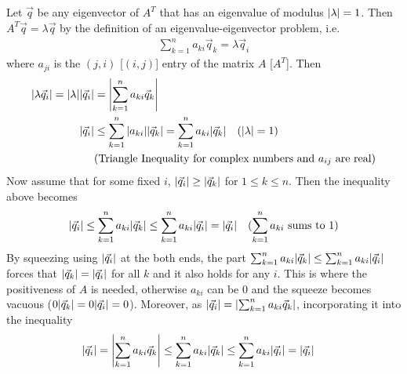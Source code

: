 Let $\vec{q}$ be any eigenvector of $A^T$ that has an eigenvalue of modulus $\abs{\lambda} = 1$. Then $A^T\vec{q} = \lambda \vec{q}$ by the definition of an eigenvalue-eigenvector problem, i.e.\
\begin{align}
\sum_{k=1}^{n} a_{ki}\vec{q}_k = \lambda \vec{q}_i
\end{align}
where $a_{ji}$ is the $(j,i)$ [$(i,j)$] entry of the matrix $A$ [$A^T$]. Then
\begin{align}
\abs{\lambda \vec{q}_i} = \abs{\lambda}\abs{\vec{q}_i} &= \abs{\sum_{k=1}^{n} a_{ki}\vec{q}_k} \nonumber \\
\abs{\vec{q}_i} &\leq \sum_{k=1}^{n} \abs{a_{ki}}\abs{\vec{q}_k} = \sum_{k=1}^{n} a_{ki}\abs{\vec{q}_k} \quad (\abs{\lambda} = 1)\\
&\text{(Triangle Inequality for complex numbers and $a_{ij}$ are real)} \nonumber
\end{align}
Now assume that for some fixed $i$, $\abs{\vec{q}_i} \geq \abs{\vec{q}_k}$ for $1 \leq k \leq n$. Then the inequality above becomes
\begin{align}
\abs{\vec{q}_i} \leq \sum_{k=1}^{n} a_{ki}\abs{\vec{q}_k} &\leq \sum_{k=1}^{n} a_{ki}\abs{\vec{q}_i} = \abs{\vec{q}_i}  & \text{($\sum_{k=1}^{n} a_{ki}$ sums to $1$)}
\end{align}
By squeezing using $\abs{\vec{q}_i}$ at the both ends, the part $\sum_{k=1}^{n} a_{ki}\abs{\vec{q}_k} \leq \sum_{k=1}^{n} a_{ki}\abs{\vec{q}_i}$ forces that $\abs{\vec{q}_k} = \abs{\vec{q}_i}$ for all $k$ and it also holds for any $i$. This is where the positiveness of $A$ is needed, otherwise $a_{ki}$ can be $0$ and the squeeze becomes vacuous ($0\abs{\vec{q}_k} = 0\abs{\vec{q}_i} = 0$). Moreover, as $\abs{\vec{q}_i} = \abs{\sum_{k=1}^{n} a_{ki}\vec{q}_k}$, incorporating it into the inequality
\begin{align}
\abs{\vec{q}_i} = \abs{\sum_{k=1}^{n} a_{ki}\vec{q}_k} \leq \sum_{k=1}^{n} a_{ki}\abs{\vec{q}_k} &\leq \sum_{k=1}^{n} a_{ki}\abs{\vec{q}_i} = \abs{\vec{q}_i}
\end{align}

